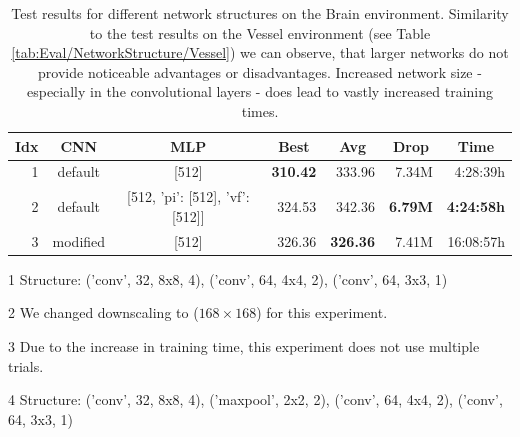 \begin{table}[htp]
    \begin{center}
        \begin{threeparttable}
            \begin{tabular}{rccrrrr}
                \toprule
                \multicolumn{1}{c}{Idx} & \multicolumn{1}{c}{CNN} & \multicolumn{1}{c}{MLP} & \multicolumn{1}{c}{Best} & \multicolumn{1}{c}{Avg} & \multicolumn{1}{c}{Drop} & \multicolumn{1}{c}{Time}\\
                \midrule
                1 & default\tnote{1} & [512] & \textbf{310.42} & 333.96 & 7.34M & 4:28:39h \\
                2 & default\tnote{1} & [512, {'pi': [512], 'vf': [512]}] & 324.53 & 342.36 & \textbf{6.79M} & \textbf{4:24:58h} \\
                3\tnote{2,3} & modified\tnote{4} & [512] & 326.36 & \textbf{326.36} & 7.41M & 16:08:57h \\
                \bottomrule
            \end{tabular}
            \begin{tablenotes} \footnotesize
                \item[1] Structure: ('conv', 32, 8x8, 4), ('conv', 64, 4x4, 2), ('conv', 64, 3x3, 1)
                \item[2] We changed downscaling to ($168 \times 168$) for this experiment.
                \item[3] Due to the increase in training time, this experiment does not use multiple trials. 
                \item[4] Structure: ('conv', 32, 8x8, 4), ('maxpool', 2x2, 2), ('conv', 64, 4x4, 2), ('conv', 64, 3x3, 1)
            \end{tablenotes}
        \end{threeparttable}
    \end{center}
    \caption[Test Results for Different Network Structures on the Brain Environment]{Test results for different network structures on the Brain environment. Similarity to the test results on the Vessel environment (see Table \ref{tab:Eval/NetworkStructure/Vessel}) we can observe, that larger networks do not provide noticeable advantages or disadvantages. Increased network size - especially in the convolutional layers - does lead to vastly increased training times.} \label{tab:Eval/NetworkStructure/Brain}
\end{table}

